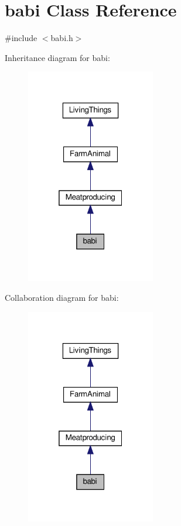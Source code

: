 \hypertarget{classbabi}{}\section{babi Class Reference}
\label{classbabi}


{\ttfamily \#include $<$babi.\+h$>$}



Inheritance diagram for babi\+:
\nopagebreak
\begin{figure}[H]
\begin{center}
\leavevmode
\includegraphics[width=160pt]{classbabi__inherit__graph}
\end{center}
\end{figure}


Collaboration diagram for babi\+:
\nopagebreak
\begin{figure}[H]
\begin{center}
\leavevmode
\includegraphics[width=160pt]{classbabi__coll__graph}
\end{center}
\end{figure}
